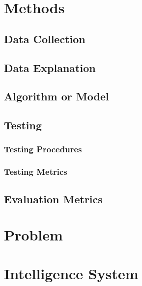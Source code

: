 \documentclass[a4paper,12pt]{report}
\begin{document}
\chapter{Methods}
\section{Data Collection}

\section{Data Explanation}

\section{Algorithm or Model}

\section{Testing}
\subsection{Testing Procedures}
\subsection{Testing Metrics}

\section{Evaluation Metrics}

\chapter{Problem}

\chapter{Intelligence System}
\end{document}
